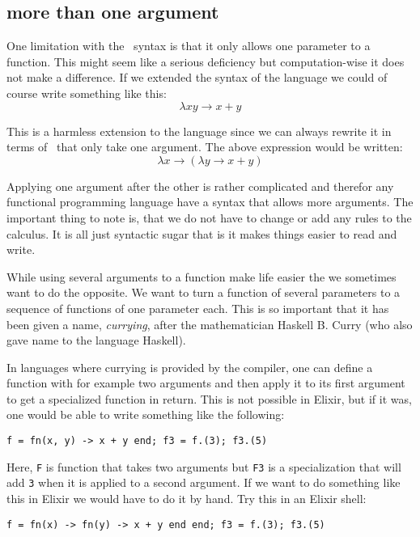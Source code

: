 \documentclass[a4paper,11pt]{article}
\begin{document}
\subsection{more than one argument}

One limitation with the \lamc\ syntax is that it only allows one
parameter to a function. This might seem like a serious deficiency but
computation-wise it does not make a difference. If we extended the
syntax of the language we could of course write something like this:
$$\lambda x y \rightarrow x + y$$

This is a harmless extension to the language since we can always
rewrite it in terms of \lama\ that only take one argument. The above
expression would be written:
$$\lambda x \rightarrow (\lambda y \rightarrow x + y )$$

Applying one argument after the other is rather complicated and
therefor any functional programming language have a syntax that allows
more arguments. The important thing to note is, that we do not have to
change or add any rules to the calculus. It is all just syntactic sugar
that is it makes things easier to read and write.

While using several arguments to a function make life easier the
we sometimes want to do the opposite. We want to
turn a function of several parameters to a sequence of functions of
one parameter each. This is so important that it has been given a
name, {\em currying}, after the mathematician Haskell B. Curry (who also
gave name to the language Haskell).

In languages where currying is provided by the compiler, one can define
a function with for example two arguments and then apply it to its
first argument to get a specialized function in return. This is not
possible in Elixir, but if it was, one would be able to write something
like the following:

\vspace{10pt}
\begin{center}{\tt f = fn(x, y) ->  x  + y end; f3 = f.(3); f3.(5)}
\end{center}
\vspace{10pt}

Here, {\tt F} is function that takes two arguments but {\tt F3} is a
specialization that will add {\tt 3} when it is applied to a second
argument. If we want to do something like this in Elixir we would have
to do it by hand. Try this in an Elixir shell:

\vspace{10pt}
\begin{center}{\tt f = fn(x) -> fn(y) ->  x  + y end end; f3 = f.(3); f3.(5)}
\end{center}
\vspace{10pt}
\end{document}
